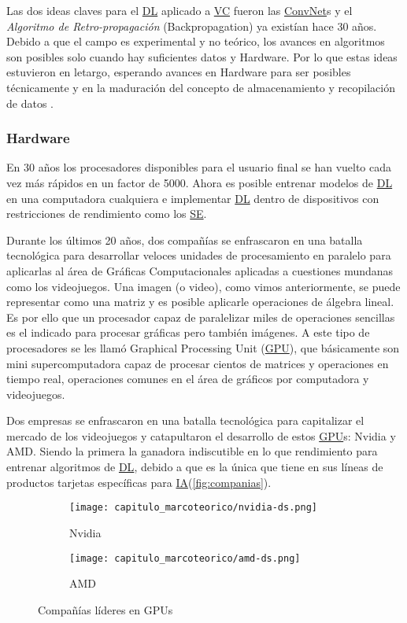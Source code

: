 Las dos ideas claves para el \hyperlink{abbr}{DL} aplicado a
\hyperlink{abbr}{VC} fueron las \hyperlink{abbr}{ConvNet}s y el \emph{Algoritmo
de Retro-propagación} (Backpropagation) ya existían hace 30 años. Debido a que
el campo es experimental y no teórico, los avances en algoritmos son posibles
solo cuando hay suficientes datos y Hardware. Por lo que estas ideas estuvieron
en letargo, esperando avances en Hardware para ser posibles técnicamente y en la
maduración del concepto de almacenamiento y recopilación de datos \cite{Chollet2018}.

\subsubsection{Hardware}

En 30 años los procesadores disponibles para el usuario final se han vuelto cada
vez más rápidos en un factor de 5000. Ahora es posible entrenar modelos de
\hyperlink{abbr}{DL} en una computadora cualquiera e implementar
\hyperlink{abbr}{DL} dentro de dispositivos con restricciones de rendimiento
como los \hyperlink{abbr}{SE}.

Durante los últimos 20 años, dos compañías se enfrascaron en una batalla
tecnológica para desarrollar veloces unidades de procesamiento en paralelo para
aplicarlas al área de Gráficas Computacionales aplicadas a cuestiones mundanas
como los videojuegos. Una imagen (o video), como vimos anteriormente, se puede
representar como una matriz y es posible aplicarle operaciones de álgebra
lineal. Es por ello que un procesador capaz de paralelizar miles de operaciones
sencillas es el indicado para procesar gráficas pero también imágenes. A este
tipo de procesadores se les llamó Graphical Processing Unit
(\hyperlink{abbr}{GPU}), que
básicamente son mini supercomputadora capaz de procesar cientos de matrices y
operaciones en tiempo real, operaciones comunes en el área de gráficos por
computadora y videojuegos. 

Dos empresas se enfrascaron en una batalla tecnológica para capitalizar el
mercado de los videojuegos y catapultaron el desarrollo de estos
\hyperlink{abbr}{GPU}s: Nvidia y AMD. Siendo la primera la ganadora indiscutible
en lo que rendimiento para entrenar algoritmos de \hyperlink{abbr}{DL}, debido a
que es la única que tiene en sus líneas de productos tarjetas específicas para
\hyperlink{abbr}{IA}(\autoref{fig:companias}).


\begin{figure}[H]
    \centering
    \begin{subfigure}{.5\textwidth}
      \centering
      \texttt{[image: capitulo\_marcoteorico/nvidia-ds.png]}
      \caption{Nvidia}
      \label{fig:Nvidia}
    \end{subfigure}%
    \begin{subfigure}{.5\textwidth}
      \centering
      \texttt{[image: capitulo\_marcoteorico/amd-ds.png]}
      \caption{AMD}
      \label{fig:AMD}
    \end{subfigure}
    \caption{Compañías líderes en GPUs}
    \label{fig:companias}
    \end{figure}

